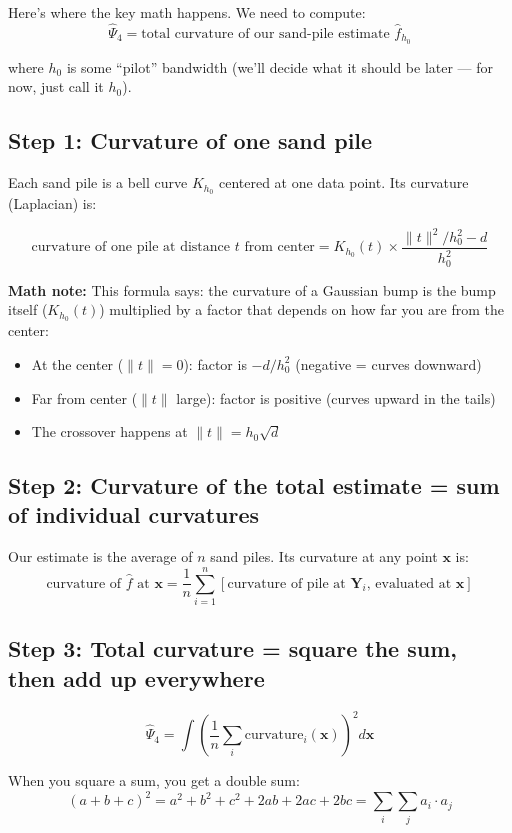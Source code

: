 \documentclass[12pt]{article}
\newcommand{\mathnote}[1]{\begin{tcolorbox}[colback=yellow!5,colframe=yellow!60!black,breakable]\textbf{Math note:} #1\end{tcolorbox}}
\begin{document}
Here's where the key math happens. We need to compute:
$$\hat\Psi_4 = \text{total curvature of our sand-pile estimate }\hat{f}_{h_0}$$

where $h_0$ is some ``pilot'' bandwidth (we'll decide what it should be later --- for now, just call it $h_0$).

\subsection{Step 1: Curvature of one sand pile}

Each sand pile is a bell curve $K_{h_0}$ centered at one data point. Its curvature (Laplacian) is:

$$\text{curvature of one pile at distance } t \text{ from center} = K_{h_0}(t) \times \frac{\|t\|^2/h_0^2 - d}{h_0^2}$$

\mathnote{
This formula says: the curvature of a Gaussian bump is the bump itself ($K_{h_0}(t)$) multiplied by a factor that depends on how far you are from the center:
\begin{itemize}
\item At the center ($\|t\|=0$): factor is $-d/h_0^2$ (negative = curves downward)
\item Far from center ($\|t\|$ large): factor is positive (curves upward in the tails)
\item The crossover happens at $\|t\| = h_0\sqrt{d}$
\end{itemize}
}

\subsection{Step 2: Curvature of the total estimate = sum of individual curvatures}

Our estimate is the average of $n$ sand piles. Its curvature at any point $\mathbf{x}$ is:
$$\text{curvature of }\hat{f}\text{ at }\mathbf{x} = \frac{1}{n}\sum_{i=1}^n [\text{curvature of pile at }\mathbf{Y}_i\text{, evaluated at }\mathbf{x}]$$

\subsection{Step 3: Total curvature = square the sum, then add up everywhere}

$$\hat\Psi_4 = \int \left(\frac{1}{n}\sum_i \text{curvature}_i(\mathbf{x})\right)^2 d\mathbf{x}$$

When you square a sum, you get a double sum:
$$(a + b + c)^2 = a^2 + b^2 + c^2 + 2ab + 2ac + 2bc = \sum_i \sum_j a_i \cdot a_j$$
\end{document}
